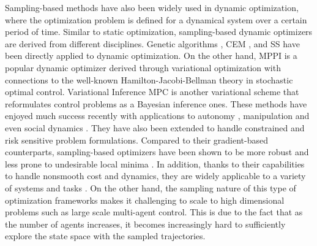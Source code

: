 \documentclass[twoside,11pt]{article}
\begin{document}

Sampling-based methods have also been widely used in dynamic optimization, where the optimization problem is defined for a dynamical system over a certain period of time. Similar to static optimization, sampling-based dynamic optimizers are derived from different disciplines. Genetic algorithms \citep{michalewicz1990genetic}, \ac{CEM} \citep{kobilarov2012cross}, and \ac{SS} \citep{wang2019information} have been directly applied to dynamic optimization. On the other hand, \ac{MPPI} \citep{williams2016aggressive} is a popular dynamic optimizer derived through variational optimization with connections to the well-known Hamilton-Jacobi-Bellman theory in stochastic optimal control. Variational Inference \ac{MPC} \citep{okada2020variational} is another variational scheme that reformulates control problems as a Bayesian inference ones. These methods have enjoyed much success recently with applications to autonomy \citep{williams2016aggressive, williams2018best}, manipulation \citep{nagabandi2020deep} and even social dynamics \citep{wang2017variational, wang2022opinion}. They have also been extended to handle constrained \citep{boutselis2020constrained} and risk sensitive \citep{wang2021adaptive} problem formulations. Compared to their gradient-based counterparts, sampling-based optimizers have been shown to be more robust and less prone to undesirable local minima \citep{williams2017model}. In addition, thanks to their capabilities to handle nonsmooth cost and dynamics, they are widely applicable to a variety of systems and tasks \citep{williams2016aggressive, nagabandi2020deep, evans2021stochastic}. On the other hand, the sampling nature of this type of optimization frameworks makes it challenging to scale to high dimensional problems such as large scale multi-agent control. This is due to the fact that as the number of agents increases, it becomes increasingly hard to sufficiently explore the state space with the sampled trajectories.
\end{document}
